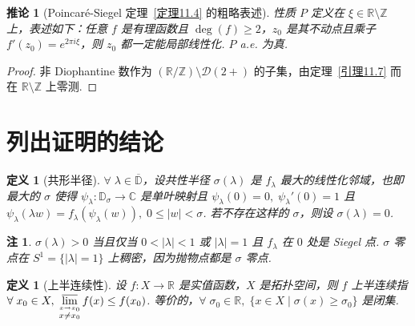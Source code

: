 \documentclass[11pt, a4paper, oneside]{ctexart}
\newtheorem{corollary}[theorem]{推论}
\newtheorem{definition}[theorem]{定义}
\newtheorem{remark}[theorem]{注}
\newcommand{\C}{\mathbb{C}}
\newcommand{\D}{\mathbb{D}}
\newcommand{\R}{\mathbb{R}}
\newcommand{\Z}{\mathbb{Z}}
\newcommand{\cD}{\mathcal{D}}
\newcommand{\abs}[1]{\left|{#1}\right|}
\begin{document}
    \begin{corollary}[Poincaré-Siegel 定理~\ref{定理11.4} 的粗略表述]
        性质 $P$ 定义在 $\xi\in\R\setminus\Z$ 上，表述如下：任意 $f$ 是有理函数且 $\deg(f)\geq 2$，$z_0$ 是其不动点且乘子 $f'(z_0)=e^{2\pi i\xi}$，则 $z_0$ 都一定能局部线性化. $P$ a.e. 为真.
    \end{corollary}
    \begin{proof}
        非 Diophantine 数作为 $(\R/\Z)\setminus \cD(2+)$ 的子集，由定理~\ref{引理11.7} 而在 $\R\setminus\Z$ 上零测.
    \end{proof}

    \section{列出证明的结论}
    \begin{definition}[共形半径]
        $\forall\; \lambda\in \overline{\D}$，设共性半径 $\sigma(\lambda)$ 是 $f_{\lambda}$ 最大的线性化邻域，也即最大的 $\sigma$ 使得 $\psi_{\lambda}:\D_{\sigma}\to\C$ 是单叶映射且 $\psi_{\lambda}(0)=0,\;\psi_{\lambda}'(0)=1$ 且 $\psi_{\lambda}(\lambda w)=f_{\lambda}(\psi_{\lambda}(w)),\; 0\leq \abs{w}<\sigma$. 若不存在这样的 $\sigma$，则设 $\sigma(\lambda)=0$.
    \end{definition}
    \begin{remark}
        $\sigma(\lambda)>0$ 当且仅当 $0<\abs{\lambda}<1$ 或 $\abs{\lambda}=1$ 且 $f_{\lambda}$ 在 $0$ 处是 Siegel 点. $\sigma$ 零点在 $S^1=\{\abs{\lambda}=1\}$ 上稠密，因为抛物点都是 $\sigma$ 零点.
    \end{remark}

    \begin{definition}[上半连续性]
        设 $f:X\to \R$ 是实值函数，$X$ 是拓扑空间，则 $f$ 上半连续指 $\forall\; x_0\in X,\; \varlimsup\limits_{\stackrel{x\to x_0}{x\neq x_0}}f(x)\leq f(x_0)$. 等价的，$\forall\;\sigma_0\in\R,\;\{x\in X\mid \sigma(x)\geq \sigma_0\}$ 是闭集.
    \end{definition}
\end{document}
